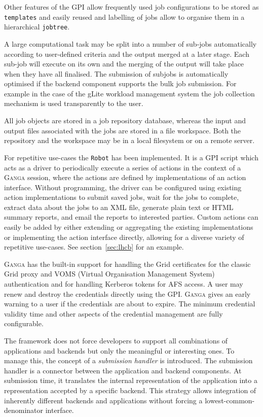 \documentclass{elsart}
\def\ganga {\textsc{Ganga}\xspace}
\def\grid {Grid\xspace}
\def\GPI{GPI\xspace}
\newcommand{\code}[1]{\texttt{#1}}
\begin{document}
Other features of the \GPI allow frequently used job configurations to be
stored as \code{templates} and easily reused and labelling of jobs allow to
organise them in a hierarchical \code{jobtree}.

A large computational task may be split into a number of sub-jobs
automatically according to user-defined criteria and the output merged
at a later stage. Each sub-job will execute on its own and the merging
of the output will take place when they have all finalised. The
submission of subjobs is automatically optimised if the backend
component supports the bulk job submission. For example in the case of
the gLite \cite{LCG} workload management system the job collection
mechanism is used transparently to the user.

All job objects are stored in a job repository database, whereas the input
and output files associated with the jobs are stored in a file workspace. Both
the repository and the workspace may be in a local filesystem or on a remote
server.

For repetitive use-cases the \code{Robot} has been implemented. It is a \GPI
script which acts as a driver to periodically execute a series of
actions in the context of a \ganga session, where the actions are defined by
implementations of an action interface.  Without programming, the driver can be
configured using existing action implementations to submit saved jobs, wait
for the jobs to complete, extract data about the jobs to an XML file, generate
plain text or HTML summary reports, and email the reports to interested
parties. Custom actions can easily be added by either extending or aggregating
the existing implementations or implementing the action interface directly,
allowing for a diverse variety of repetitive use-cases. See
section~\ref{sec:lhcb} for an example.


\ganga has the built-in support for handling the \grid certificates for
the classic \grid proxy and VOMS (Virtual Organisation Management
System) \cite{VOMS} authentication and for handling Kerberos\cite{Kerberos} tokens
for AFS \cite{AFS} access. A user may renew and destroy the
credentials directly using the GPI. \ganga gives an early warning to a
user if the credentials are about to expire. The minimum credential
validity time and other aspects of the credential management are fully
configurable.

The framework does not force developers to support all combinations of
applications and backends but only the meaningful or interesting ones. To manage
this, the concept of a {\em submission handler} is introduced. The submission
handler is a connector between the application and backend components. At
submission time, it translates the internal representation of the application
into a representation accepted by a specific backend. This strategy allows
integration of inherently different backends and applications without forcing
a lowest-common-denominator interface.
\end{document}
